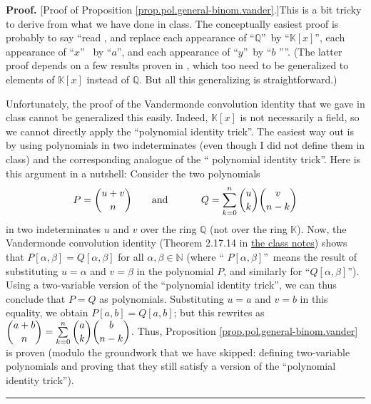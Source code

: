 \documentclass[paper=a4, fontsize=12pt]{scrartcl}%
\let\sumnonlimits\sum
\renewcommand{\sum}{\sumnonlimits\limits}
\theoremstyle{plainsl}
\theoremstyle{definition}
\theoremstyle{remark}
\newenvironment{proof}[1][Proof]{\noindent\textbf{#1.} }{\ \rule{0.5em}{0.5em}}
\begin{document}
\begin{proof}
[Proof of Proposition \ref{prop.pol.general-binom.vander}.]This is a bit
tricky to derive from what we have done in class. The conceptually easiest
proof is probably to say \textquotedblleft read \cite[First proof of Theorem
3.29]{detnotes}, and replace each appearance of \textquotedblleft$\mathbb{Q}%
$\textquotedblright\ by \textquotedblleft$\mathbb{K}\left[  x\right]
$\textquotedblright, each appearance of \textquotedblleft$x$\textquotedblright%
\ by \textquotedblleft$a$\textquotedblright, and each appearance of
\textquotedblleft$y$\textquotedblright\ by \textquotedblleft$b$%
\textquotedblright\textquotedblright. (The latter proof depends on a few
results proven in \cite[\S 3.1]{detnotes}, which too need to be generalized to
elements of $\mathbb{K}\left[  x\right]  $ instead of $\mathbb{Q}$. But all
this generalizing is straightforward.)

Unfortunately, the proof of the Vandermonde convolution identity that we gave
in class cannot be generalized this easily. Indeed, $\mathbb{K}\left[
x\right]  $ is not necessarily a field, so we cannot directly apply the
\textquotedblleft polynomial identity trick\textquotedblright. The easiest way
out is by using polynomials in two indeterminates (even though I did not
define them in class) and the corresponding analogue of the \textquotedblleft
polynomial identity trick\textquotedblright. Here is this argument in a
nutshell: Consider the two polynomials%
\[
P=\dbinom{u+v}{n}\qquad\text{and}\ \ \ \ \ \ \ \ \ \ Q=\sum_{k=0}^{n}%
\dbinom{u}{k}\dbinom{v}{n-k}%
\]
in two indeterminates $u$ and $v$ over the ring $\mathbb{Q}$ (not over the
ring $\mathbb{K}$). Now, the Vandermonde convolution identity (Theorem 2.17.14
in \href{http://www.cip.ifi.lmu.de/~grinberg/t/19s/notes.pdf}{the class
notes}) shows that $P\left[  \alpha,\beta\right]  =Q\left[  \alpha
,\beta\right]  $ for all $\alpha,\beta\in\mathbb{N}$ (where \textquotedblleft%
$P\left[  \alpha,\beta\right]  $\textquotedblright\ means the result of
substituting $u=\alpha$ and $v=\beta$ in the polynomial $P$, and similarly for
\textquotedblleft$Q\left[  \alpha,\beta\right]  $\textquotedblright). Using a
two-variable version of the \textquotedblleft polynomial identity
trick\textquotedblright, we can thus conclude that $P=Q$ as polynomials.
Substituting $u=a$ and $v=b$ in this equality, we obtain $P\left[  a,b\right]
=Q\left[  a,b\right]  $; but this rewrites as $\dbinom{a+b}{n}=\sum_{k=0}%
^{n}\dbinom{a}{k}\dbinom{b}{n-k}$. Thus, Proposition
\ref{prop.pol.general-binom.vander} is proven (modulo the groundwork that we
have skipped: defining two-variable polynomials and proving that they still
satisfy a version of the \textquotedblleft polynomial identity
trick\textquotedblright).
\end{proof}
\end{document}
